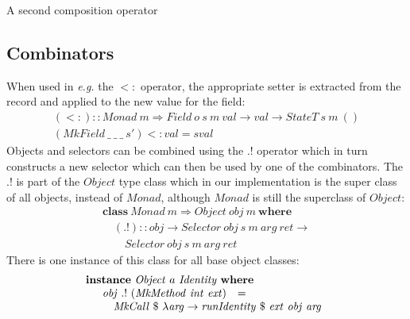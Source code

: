 A second composition operator

\subsection{Combinators}

When used in \emph{e.g.} the $<:$ operator, the appropriate setter is extracted from the record and applied to the new value for the field:
\begin{displaymath}
\begin{array}{l}
(<:)  ::  \mathit{Monad}~m \Rightarrow \mathit{Field}~o~s~m~\mathit{val} \to \mathit{val} \to \mathit{StateT}~s~m~()\\
(\mathit{MkField}~\_~\_~\_~s') <: val  =  s val
\end{array}
\end{displaymath}
Objects and selectors can be combined using the $.!$ operator which in turn constructs a new selector which can then be used by one of the combinators. The $.!$ is part of the $\mathit{Object}$ type class which in our implementation is the super class of all objects, instead of $\mathit{Monad}$, although $\mathit{Monad}$ is still the superclass of $\mathit{Object}$:
\begin{displaymath}
\begin{array}{l}
\mathbf{class}~\mathit{Monad}~m \Rightarrow \mathit{Object}~\mathit{obj}~m~\mathbf{where}\\
\quad (.!) :: \mathit{obj} \to \mathit{Selector}~\mathit{obj}~s~m~\mathit{arg}~\mathit{ret} \to \\ \qquad \mathit{Selector}~\mathit{obj}~s~m~\mathit{arg}~\mathit{ret}
\end{array}
\end{displaymath}
There is one instance of this class for all base object classes:
\begin{displaymath}
\begin{array}{l}
\mathbf{instance}~\mathit{Object}~a~\mathit{Identity}~\mathbf{where}\\
\quad \begin{array}{lcl}
\mathit{obj}~.!~(\mathit{MkMethod}~\mathit{int}~\mathit{ext}) & = & \\
\multicolumn{3}{l}{\quad \mathit{MkCall}~ \$~\lambda \mathit{arg} \to \mathit{runIdentity}~\$~\mathit{ext}~\mathit{obj}~\mathit{arg} } %
\end{array}
\end{array}
\end{displaymath}

